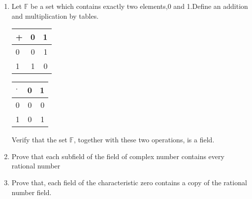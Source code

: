 \begin{enumerate}[label=\thesubsection.\arabic*.,ref=\thesubsection.\theenumi]
\item Let $\mathbb{F}$ be a set which contains exactly two elements,0 and 1.Define an addition and multiplication by tables.
\begin{table}[h!]
  \begin{center}
    \label{eq:solutions/1/1/5/tab:table1}
    \begin{tabular}{l|c|r}
      + & 0 & 1 \\
      \hline
      0 & 0 & 1\\
      1 & 1 & 0
    \end{tabular}
  \end{center}
\end{table}
\begin{table}[h!]
  \begin{center}
    \label{eq:solutions/1/1/5/tab:table2}
    \begin{tabular}{l|c|r}
      $\cdot$ & 0 & 1 \\
      \hline
      0 & 0 & 0\\
      1 & 0 & 1
    \end{tabular}
  \end{center}
\end{table}
  Verify that the set $\mathbb{F}$, together with these two operations, is a field.
%
\\
\solution

\item Prove that each subfield of the field of complex number contains every rational number
\\
\solution

%
\item Prove that, each field of the characteristic zero contains a copy of the rational number field.
\\
\solution

\end{enumerate}


